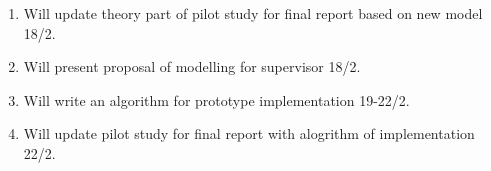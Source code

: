 \begin{enumerate}
    \item Will update theory part of pilot study for final report based on new
    model 18/2.
    \item Will present proposal of modelling for supervisor 18/2.
    \item Will write an algorithm for prototype implementation 19-22/2.
    \item Will update pilot study for final report with alogrithm of
     implementation 22/2.
\end{enumerate}
